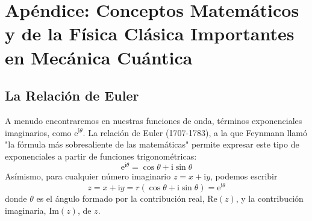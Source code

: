 \chapter{Apéndice: Conceptos Matemáticos y de la Física Clásica
Importantes en Mecánica Cuántica}
\section{La Relación de Euler}
A menudo encontraremos en nuestras funciones de onda, términos
exponenciales imaginarios, como $\mathrm{e}^{\mathrm{i}\theta}$.
La relación de Euler (1707-1783), a la que Feynmann llamó "la
fórmula más sobresaliente de las matemáticas" permite expresar
este tipo de exponenciales a partir de funciones trigonométricas:
\begin{equation}
    \mathrm{e}^{\mathrm{i}\theta} = \cos{\theta} + \mathrm{i}\sin{\theta}
\end{equation}
Asímismo, para cualquier número imaginario $z=x + \mathrm{i}y$,
podemos escribir
\begin{equation}
    z=x + \mathrm{i}y = r(\cos{\theta} + \mathrm{i}\sin{\theta})=
    \mathrm{e}^{\mathrm{i}\theta}
\end{equation}
donde $\theta$ es el ángulo formado por la contribución 
real, $\mathrm{Re}(z)$, y la contribución imaginaria, 
$\mathrm{Im}(z)$, de $z$.



